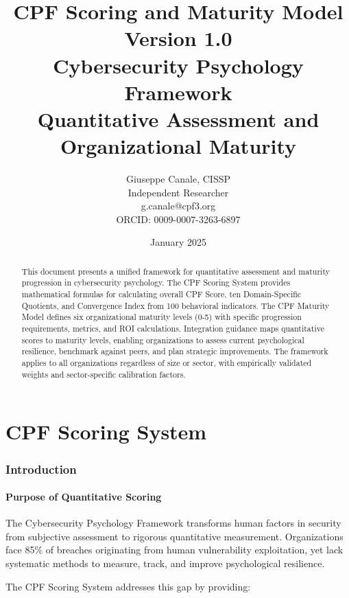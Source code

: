 \documentclass[11pt,a4paper]{article}
\title{\textbf{CPF Scoring and Maturity Model}\\
\large Version 1.0\\
\large Cybersecurity Psychology Framework\\
Quantitative Assessment and Organizational Maturity}
\author{Giuseppe Canale, CISSP\\
\small Independent Researcher\\
\small g.canale@cpf3.org\\
\small ORCID: 0009-0007-3263-6897}
\date{January 2025}
\begin{document}
\maketitle

\begin{abstract}
This document presents a unified framework for quantitative assessment and maturity progression in cybersecurity psychology. The CPF Scoring System provides mathematical formulas for calculating overall CPF Score, ten Domain-Specific Quotients, and Convergence Index from 100 behavioral indicators. The CPF Maturity Model defines six organizational maturity levels (0-5) with specific progression requirements, metrics, and ROI calculations. Integration guidance maps quantitative scores to maturity levels, enabling organizations to assess current psychological resilience, benchmark against peers, and plan strategic improvements. The framework applies to all organizations regardless of size or sector, with empirically validated weights and sector-specific calibration factors.
\end{abstract}

\tableofcontents
\newpage


\part{CPF Scoring System}

\section{Introduction}

\subsection{Purpose of Quantitative Scoring}

The Cybersecurity Psychology Framework transforms human factors in security from subjective assessment to rigorous quantitative measurement. Organizations face 85\% of breaches originating from human vulnerability exploitation, yet lack systematic methods to measure, track, and improve psychological resilience.

The CPF Scoring System addresses this gap by providing:
\end{document}

